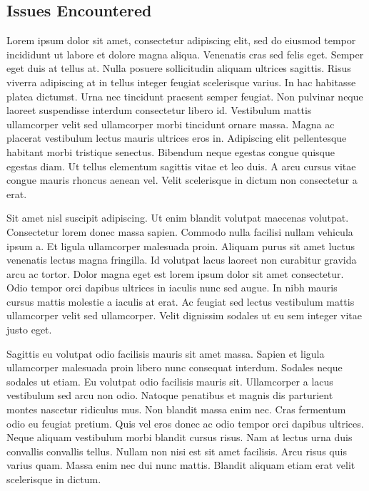 \documentclass[12pt]{article}
\begin{document}
\subsection{Issues Encountered}
Lorem ipsum dolor sit amet, consectetur adipiscing elit, sed do eiusmod tempor incididunt ut labore et dolore magna aliqua. Venenatis cras sed felis eget. Semper eget duis at tellus at. Nulla posuere sollicitudin aliquam ultrices sagittis. Risus viverra adipiscing at in tellus integer feugiat scelerisque varius. In hac habitasse platea dictumst. Urna nec tincidunt praesent semper feugiat. Non pulvinar neque laoreet suspendisse interdum consectetur libero id. Vestibulum mattis ullamcorper velit sed ullamcorper morbi tincidunt ornare massa. Magna ac placerat vestibulum lectus mauris ultrices eros in. Adipiscing elit pellentesque habitant morbi tristique senectus. Bibendum neque egestas congue quisque egestas diam. Ut tellus elementum sagittis vitae et leo duis. A arcu cursus vitae congue mauris rhoncus aenean vel. Velit scelerisque in dictum non consectetur a erat.\par
Sit amet nisl suscipit adipiscing. Ut enim blandit volutpat maecenas volutpat. Consectetur lorem donec massa sapien. Commodo nulla facilisi nullam vehicula ipsum a. Et ligula ullamcorper malesuada proin. Aliquam purus sit amet luctus venenatis lectus magna fringilla. Id volutpat lacus laoreet non curabitur gravida arcu ac tortor. Dolor magna eget est lorem ipsum dolor sit amet consectetur. Odio tempor orci dapibus ultrices in iaculis nunc sed augue. In nibh mauris cursus mattis molestie a iaculis at erat. Ac feugiat sed lectus vestibulum mattis ullamcorper velit sed ullamcorper. Velit dignissim sodales ut eu sem integer vitae justo eget.\par
Sagittis eu volutpat odio facilisis mauris sit amet massa. Sapien et ligula ullamcorper malesuada proin libero nunc consequat interdum. Sodales neque sodales ut etiam. Eu volutpat odio facilisis mauris sit. Ullamcorper a lacus vestibulum sed arcu non odio. Natoque penatibus et magnis dis parturient montes nascetur ridiculus mus. Non blandit massa enim nec. Cras fermentum odio eu feugiat pretium. Quis vel eros donec ac odio tempor orci dapibus ultrices. Neque aliquam vestibulum morbi blandit cursus risus. Nam at lectus urna duis convallis convallis tellus. Nullam non nisi est sit amet facilisis. Arcu risus quis varius quam. Massa enim nec dui nunc mattis. Blandit aliquam etiam erat velit scelerisque in dictum.\par
\end{document}
